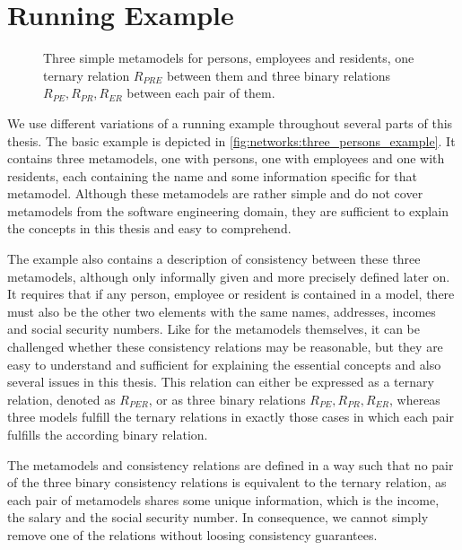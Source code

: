\section{Running Example}
\label{chap:networks:example}


\begin{figure}
    \centering
    
    \caption[Three metamodels with exemplary consistency relations]{Three simple metamodels for persons, employees and residents, one ternary relation $R_{PRE}$ between them and three binary relations $R_{PE}, R_{PR}, R_{ER}$ between each pair of them.}
    \label{fig:networks:three_persons_example}
\end{figure}

We use different variations of a running example throughout several parts of this thesis.
The basic example is depicted in \autoref{fig:networks:three_persons_example}.
It contains three metamodels, one with persons, one with employees and one with residents, each containing the name and some information specific for that metamodel.
Although these metamodels are rather simple and do not cover metamodels from the software engineering domain, they are sufficient to explain the concepts in this thesis and easy to comprehend.

The example also contains a description of consistency between these three metamodels, although only informally given and more precisely defined later on.
It requires that if any person, employee or resident is contained in a model, there must also be the other two elements with the same names, addresses, incomes and social security numbers.
Like for the metamodels themselves, it can be challenged whether these consistency relations may be reasonable, but they are easy to understand and sufficient for explaining the essential concepts and also several issues in this thesis.
This relation can either be expressed as a ternary relation, denoted as $R_{PER}$, or as three binary relations $R_{PE}, R_{PR}, R_{ER}$, whereas three models fulfill the ternary relations in exactly those cases in which each pair fulfills the according binary relation.

The metamodels and consistency relations are defined in a way such that no pair of the three binary consistency relations is equivalent to the ternary relation, as each pair of metamodels shares some unique information, which is the income, the salary and the social security number.
In consequence, we cannot simply remove one of the relations without loosing consistency guarantees.


